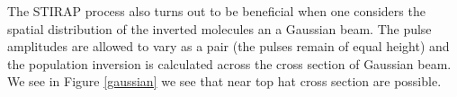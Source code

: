 
The STIRAP process also turns out to be beneficial when one considers the spatial distribution of the inverted molecules an a Gaussian beam. The pulse amplitudes are allowed to vary as a pair (the pulses remain of equal height) and the population inversion is calculated across the cross section of Gaussian beam. We see in Figure \ref{gaussian} we see that near top hat cross section are possible.
